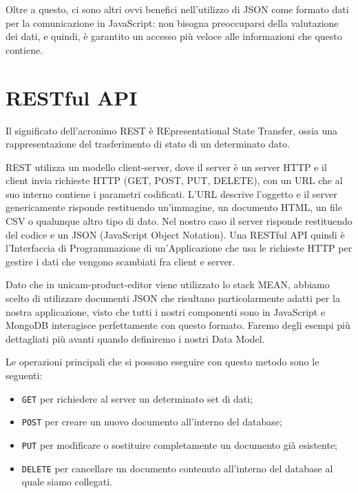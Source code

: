 Oltre a questo, ci sono altri ovvi benefici nell'utilizzo di JSON come formato dati per la comunicazione in JavaScript: non bisogna preoccuparsi della valutazione dei dati, e quindi, è garantito un accesso più veloce alle informazioni che questo contiene.



\section{RESTful API}
Il significato dell’acronimo REST è REpresentational State Transfer, ossia una rappresentazione del trasferimento di stato di un determinato dato.

REST utilizza un modello client-server, dove il server è un server HTTP e il client invia richieste HTTP (GET, POST, PUT, DELETE), con un URL che al suo interno contiene i parametri codificati. L'URL descrive l'oggetto e il server genericamente risponde restituendo un'immagine, un documento HTML, un file CSV o qualunque altro tipo di dato.
Nel nostro caso il server risponde restituendo del codice e un JSON (JavaScript Object Notation).
Una RESTful API quindi è l'Interfaccia di Programmazione di un'Applicazione che usa le richieste HTTP per gestire i dati che vengono scambiati fra client e server.

Dato che in unicam-product-editor viene utilizzato lo stack MEAN, abbiamo scelto di utilizzare documenti JSON che risultano particolarmente adatti per la nostra applicazione, visto che tutti i nostri componenti sono in JavaScript e MongoDB interagisce perfettamente con questo formato. 
Faremo degli esempi più dettagliati più avanti quando definiremo i nostri Data Model.

Le operazioni principali che si possono eseguire con questo metodo sono le seguenti:
\begin{itemize}
	\item\texttt{GET} per richiedere al server un determinato set di dati;
	\item\texttt{POST} per creare un nuovo documento all’interno del database;
	\item\texttt{PUT} per modificare o sostituire completamente un documento già esistente;
	\item\texttt{DELETE} per cancellare un documento contenuto all’interno del database al quale siamo collegati. 
\end{itemize}

